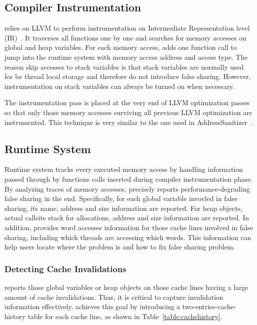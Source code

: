 \subsection{Compiler Instrumentation}
\label{sec:compiler}

\Defaults{} relies on LLVM to perform instrumentation on Intermediate Representation level (IR)~\cite{llvm}.
It traverses all functions one by one and 
searches for memory accesses on global and heap variables. 
For each memory access,  adds one function call to jump into the runtime system with memory access  
address and access type.
The reason \Defaults{} skip accesses to stack variables 
is that stack variables are normally used for be thread local storage and
therefore do not introduce false sharing. However, instrumentation on stack
variables can always be turned on when necessary. 

The instrumentation pass is placed at the very end of LLVM optimization passes 
so that only those memory accesses surviving all previous 
LLVM optimization are instrumented. This 
technique is very similar to the one used in AddressSanitizer~\cite{Addresssanitizer}.

\subsection{Runtime System}
\label{sec:runtime}

Runtime system tracks every executed memory access by handling 
information passed through by functions calls inserted during compiler
instrumentation phase. 
By analyzing traces of memory accesses,  precisely reports 
performance-degrading false sharing in the end.
Specifically, for each global variable invovled in false sharing, its name, address and size
information are reported. 
For heap objects, actual callsite stack for allocations, address 
and size information are reported. 
In addition,  provides word accesses information for those cache
lines involved in false sharing, 
including which threads are accessing which words. This information can help 
users locate where the problem is and how to fix false sharing problem.

\subsubsection{Detecting Cache Invalidations}
\Defaults{} reports those global variables or heap objects on those cache lines 
having a large amount of cache invalidations. 
Thus, it is critical to capture invalidation information effectively. 
\Defaults{} achieves this goal by introducing a  
two-entries-cache-history table for each cache line, as shown in Table~\ref{table:cachehistory}. 

